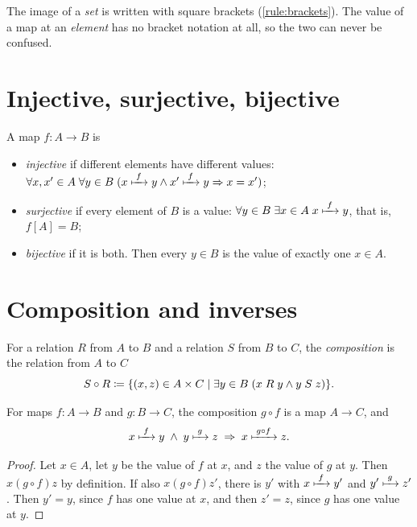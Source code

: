 The image of a \emph{set} is written with square brackets (\cref{rule:brackets}).
The value of a map at an \emph{element} has no bracket notation at all, so the two
can never be confused.

\section{Injective, surjective, bijective}

\begin{definition}
\label{def:injective}
A map $f \colon A \to B$ is
\begin{itemize}
  \item \emph{injective} if different elements have different values: $\forall x,
    x' \in A\; \forall y \in B\; (x \xmapsto{\;f\;} y \land x' \xmapsto{\;f\;} y \Rightarrow x =
    x')$;
  \item \emph{surjective} if every element of $B$ is a value: $\forall y \in B\;
    \exists x \in A\; x \xmapsto{\;f\;} y$, that is, $f[A] = B$;
  \item \emph{bijective} if it is both. Then every $y \in B$ is the value of
    exactly one $x \in A$.
\end{itemize}
\end{definition}

\section{Composition and inverses}

\begin{definition}[Composition]
\label{def:composition}
For a relation $R$ from $A$ to $B$ and a relation $S$ from $B$ to $C$, the
\emph{composition} is the relation from $A$ to $C$
\[
  S \circ R \coloneqq \lbrace (x, z) \in A \times C \mid \exists y \in B\; (x \mathrel{R}
  y \land y \mathrel{S} z) \rbrace.
\]
\end{definition}

\begin{theorem}
\label{thm:composition}
For maps $f \colon A \to B$ and $g \colon B \to C$, the composition $g \circ f$ is
a map $A \to C$, and
\[
  x \xmapsto{\;f\;} y \;\land\; y \xmapsto{\;g\;} z \;\Rightarrow\; x \xmapsto{\;g \circ f\;} z.
\]
\end{theorem}

\begin{proof}
Let $x \in A$, let $y$ be the value of $f$ at $x$, and $z$ the value of $g$ at
$y$. Then $x \mathrel{(g \circ f)} z$ by definition. If also $x \mathrel{(g \circ
f)} z'$, there is $y'$ with $x \xmapsto{\;f\;} y'$ and $y' \xmapsto{\;g\;} z'$. Then $y' = y$,
since $f$ has one value at $x$, and then $z' = z$, since $g$ has one value at $y$.
\end{proof}

